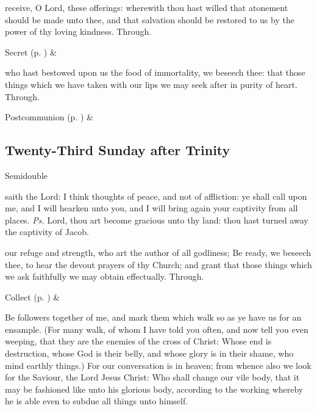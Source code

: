 
\secret
{} receive, O Lord, these offerings: wherewith thou hast willed that atonement should be made unto thee, and that salvation should be restored to us by the power of thy loving kindness. Through.
\begin{rubric}
     Secret  (p. \pageref{SPSaints}) \&  
\end{rubric}


\postcommunion
{} who hast bestowed upon us the food of immortality, we beseech thee: that those things which we have taken with our lips we may seek after in purity of heart. Through.
\begin{rubric}
     Postcommunion  (p. \pageref{SPSaints}) \&  
\end{rubric}

\subsection{Twenty-Third Sunday after Trinity}
\begin{inhead}
{Semidouble}
\end{inhead}


\introit
{} saith the Lord: I think thoughts of peace, and not of affliction: ye shall call upon me, and I will hearken unto you, and I will bring again your captivity from all places. \textit{Ps.} Lord, thou art become gracious unto thy land: thou hast turned away the captivity of Jacob.

\collect
{} our refuge and strength, who art the author of all godliness; Be ready, we beseech thee, to hear the devout prayers of thy Church; and grant that those things which we ask faithfully we may obtain effectually. Through.
\begin{rubric}
     Collect  (p. \pageref{SPSaints}) \&  
\end{rubric}

 Be followers together of me, and mark them which walk so as ye have us for an ensample. (For many walk, of whom I have told you often, and now tell you even weeping, that they are the enemies of the cross of Christ: Whose end is destruction, whose God is their belly, and whose glory is in their shame, who mind earthly things.) For our conversation is in heaven; from whence also we look for the Saviour, the Lord Jesus Christ: Who shall change our vile body, that it may be fashioned like unto his glorious body, according to the working whereby he is able even to subdue all things unto himself.

